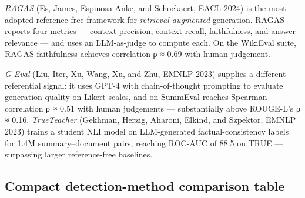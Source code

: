 \emph{RAGAS} (Es, James, Espinosa-Anke, and Schockaert, EACL 2024) is the most-adopted reference-free framework for \emph{retrieval-augmented} generation. RAGAS reports four metrics --- context precision, context recall, faithfulness, and answer relevance --- and uses an LLM-as-judge to compute each. On the WikiEval suite, RAGAS faithfulness achieves correlation ρ ≈ 0.69 with human judgement.

\emph{G-Eval} (Liu, Iter, Xu, Wang, Xu, and Zhu, EMNLP 2023) supplies a different referential signal: it uses GPT-4 with chain-of-thought prompting to evaluate generation quality on Likert scales, and on SummEval reaches Spearman correlation ρ ≈ 0.51 with human judgements --- substantially above ROUGE-L's ρ ≈ 0.16. \emph{TrueTeacher} (Gekhman, Herzig, Aharoni, Elkind, and Szpektor, EMNLP 2023) trains a student NLI model on LLM-generated factual-consistency labels for 1.4M summary--document pairs, reaching ROC-AUC of 88.5 on TRUE --- surpassing larger reference-free baselines.

\subsection{Compact detection-method comparison table}\label{compact-detection-method-comparison-table}

